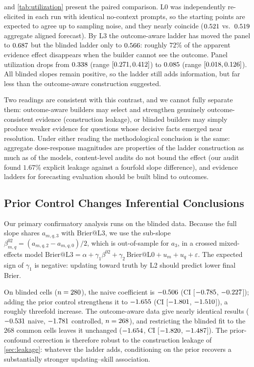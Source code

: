\documentclass[conference]{IEEEtran}
\theoremstyle{plain}
\theoremstyle{remark}
\begin{document}
 and \cref{tab:utilization} present the paired comparison. L0 was independently re-elicited in each run with identical no-context prompts, so the starting points are expected to agree up to sampling noise, and they nearly coincide ($0.521$ vs.\ $0.519$ aggregate aligned forecast). By L3 the outcome-aware ladder has moved the panel to $0.687$ but the blinded ladder only to $0.566$: roughly $72\%$ of the apparent evidence effect disappears when the builder cannot see the outcome. Panel utilization drops from $0.338$ (range $[0.271, 0.412]$) to $0.085$ (range $[0.018, 0.126]$). All blinded slopes remain positive, so the ladder still adds information, but far less than the outcome-aware construction suggested.

Two readings are consistent with this contrast, and we cannot fully separate them: outcome-aware builders may select and strengthen genuinely outcome-consistent evidence (construction leakage), or blinded builders may simply produce weaker evidence for questions whose decisive facts emerged near resolution. Under either reading the methodological conclusion is the same: aggregate dose-response magnitudes are properties of the ladder construction as much as of the models, content-level audits do not bound the effect (our audit found $1.67\%$ explicit leakage against a fourfold slope difference), and evidence ladders for forecasting evaluation should be built blind to outcomes.

\subsection{Prior Control Changes Inferential Conclusions}
\label{sec:hier}

Our primary confirmatory analysis runs on the blinded data. Because the full slope shares $a_{m,q,3}$ with Brier@L3, we use the sub-slope $\beta^{02}_{m,q} = (a_{m,q,2} - a_{m,q,0})/2$, which is out-of-sample for $a_3$, in a crossed mixed-effects model
$\mathrm{Brier@L3} = \alpha + \gamma_1 \beta^{02} + \gamma_2\,\mathrm{Brier@L0} + u_m + u_q + \varepsilon$. The expected sign of $\gamma_1$ is negative: updating toward truth by L2 should predict lower final Brier.

On blinded cells ($n=280$), the naive coefficient is $-0.506$ (CI [$-0.785$, $-0.227$]); adding the prior control strengthens it to $-1.655$ (CI [$-1.801$, $-1.510$]), a roughly threefold increase. The outcome-aware data give nearly identical results ($-0.531$ naive, $-1.781$ controlled, $n=268$), and restricting the blinded fit to the $268$ common cells leaves it unchanged ($-1.654$, CI [$-1.820$, $-1.487$]). The prior-confound correction is therefore robust to the construction leakage of \cref{sec:leakage}: whatever the ladder adds, conditioning on the prior recovers a substantially stronger updating--skill association.
\end{document}
